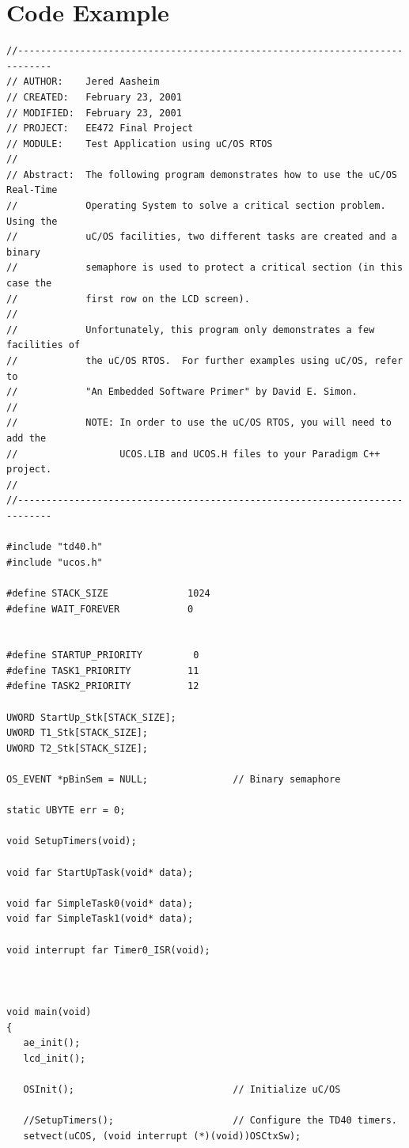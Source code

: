 \section{Code Example}
\begin{verbatim}
//----------------------------------------------------------------------------
// AUTHOR:    Jered Aasheim
// CREATED:   February 23, 2001
// MODIFIED:  February 23, 2001
// PROJECT:   EE472 Final Project
// MODULE:    Test Application using uC/OS RTOS
//
// Abstract:  The following program demonstrates how to use the uC/OS Real-Time
//            Operating System to solve a critical section problem.  Using the
//            uC/OS facilities, two different tasks are created and a binary
//            semaphore is used to protect a critical section (in this case the
//            first row on the LCD screen).
//
//            Unfortunately, this program only demonstrates a few facilities of
//            the uC/OS RTOS.  For further examples using uC/OS, refer to
//            "An Embedded Software Primer" by David E. Simon.
//
//            NOTE: In order to use the uC/OS RTOS, you will need to add the
//                  UCOS.LIB and UCOS.H files to your Paradigm C++ project.
//
//----------------------------------------------------------------------------

#include "td40.h"
#include "ucos.h"

#define STACK_SIZE              1024
#define WAIT_FOREVER            0


#define STARTUP_PRIORITY         0
#define TASK1_PRIORITY          11
#define TASK2_PRIORITY          12

UWORD StartUp_Stk[STACK_SIZE];
UWORD T1_Stk[STACK_SIZE];
UWORD T2_Stk[STACK_SIZE];

OS_EVENT *pBinSem = NULL;               // Binary semaphore

static UBYTE err = 0;

void SetupTimers(void);

void far StartUpTask(void* data);

void far SimpleTask0(void* data);
void far SimpleTask1(void* data);

void interrupt far Timer0_ISR(void);



void main(void)
{
   ae_init();
   lcd_init();

   OSInit();                            // Initialize uC/OS

   //SetupTimers();                     // Configure the TD40 timers.
   setvect(uCOS, (void interrupt (*)(void))OSCtxSw);


\end{verbatim}
